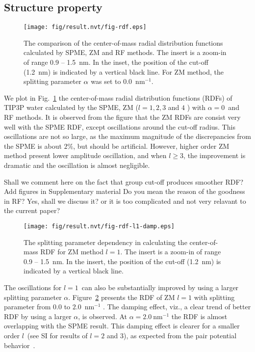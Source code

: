 \documentclass[a4paper,preprint,unsortedaddress,onecolumn,fleqn]{revtex4}
\newcommand{\recheck}[1]{{\color{red} #1}}
\newcommand{\bluec}[1]{{\color{blue} #1}}
\begin{document}
\subsection{Structure property}

\begin{figure}[tbp]
\centering
\texttt{[image: fig/result.nvt/fig-rdf.eps]}
\caption{The comparison of the center-of-mass radial distribution functions
calculated by SPME, ZM and RF methods. The insert is a zoom-in of range 0.9
-- 1.5~nm. In the inset, the position of the cut-off (1.2~nm) is indicated
by a vertical black line. For ZM method, the splitting parameter $\protect%
\alpha $ was set to 0.0~$\text{nm}^{-1}$. }
\label{fig:rdf}
\end{figure}

We plot in Fig.~\ref{fig:rdf} the center-of-mass radial distribution
functions (RDFs) of TIP3P water calculated by the SPME, ZM ($l=1,2,3$ and $4$%
) with $\alpha =0$\ and RF methods. It is observed from the figure
that the ZM RDFs are consist very well with the SPME RDF, except
oscillations around the cut-off radius. This oscillations are not so large,
as the maximum magnitude of the discrepancies from the SPME is about $2\%$, but should be artificial. However,
higher order ZM method present lower amplitude oscillation, and when $l\geq 3
$, the improvement is dramatic and the oscillation is almost negligible.

{\color{red} Shall we comment here on the fact that group cut-off produces
smoother RDF? Add figures in Supplementary material \bluec{ Do you
mean the reason of the goodness in RF?} \recheck{Yes, shall we discuss it? or it is too complicated and not very relavant to the current paper?}}

\begin{figure}[tbp]
\centering
\texttt{[image: fig/result.nvt/fig-rdf-l1-damp.eps]}
\caption{ The splitting parameter dependency in calculating the
center-of-mass RDF for ZM method $l=1$. The insert is a zoom-in of range 0.9
-- 1.5~nm. In the insert, the position of the cut-off (1.2~nm) is indicated
by a vertical black line. }
\label{fig:rdf-damp}
\end{figure}

The oscillations for $l=1$\ can also be substantially improved by using a
larger splitting parameter $\alpha $. Figure~\ref{fig:rdf-damp} presents the
RDF of ZM $l=1$ with splitting parameter from $0.0$ to $2.0$~$\text{nm}^{-1}$%
. The damping effect, viz., a clear trend of better RDF by using a larger $%
\alpha $, is observed. At $\alpha =2.0\ \text{nm}^{-1}$ the RDF is almost
overlapping with the SPME result. This damping effect is clearer for a
smaller order $l$\ (see SI for results of {$l=2$ and $3$}), as expected from
the pair potential behavior~\cite{fukuda2014zero}.
\end{document}
